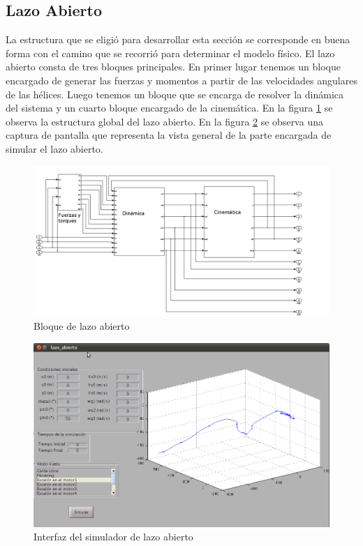 \documentclass[main]{subfiles}
\begin{document}
\subsection{Lazo Abierto}

La estructura que se eligi\'o para desarrollar esta secci\'on se corresponde en buena forma con el camino que se recorri\'o para determinar el modelo f\'isico. El lazo abierto consta de tres bloques principales. En primer lugar tenemos un bloque encargado de generar las fuerzas y momentos a partir de las velocidades angulares de las h\'elices. Luego tenemos un bloque que se encarga de resolver la din\'amica del sistema y un cuarto bloque encargado de la cinem\'atica. En la figura \ref{fig:lazo_abierto} se observa la estructura global del lazo abierto. En la figura \ref{fig:vista} se observa una captura de pantalla que representa la vista general de la parte encargada de simular el lazo abierto.
\begin{figure}[h!]
	\centering
	\includegraphics[width=1\textwidth]{./pics_simulador/lazo_abierto.png}
	\caption{Bloque de lazo abierto}
	\label{fig:lazo_abierto}
\end{figure}

\begin{figure}[h!]
	\centering
	\includegraphics[width=1\textwidth]{./pics_simulador/vista.png}
	\caption{Interfaz del simulador de lazo abierto}
	\label{fig:vista}
\end{figure}
\end{document}
